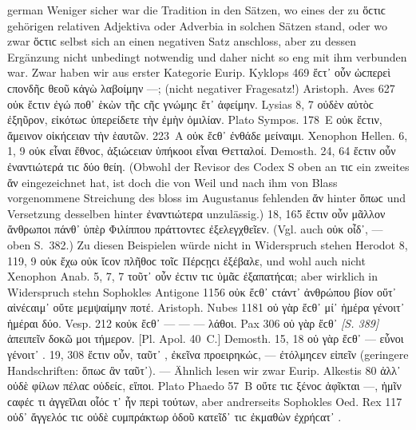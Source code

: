 \begin{otherlanguage*}{german}
Weniger sicher war die Tradition in den Sätzen, wo eines der zu ὅϲτιϲ gehörigen relativen Adjektiva oder Adverbia in solchen Sätzen stand, oder wo zwar ὅϲτιϲ selbst sich an einen negativen Satz anschloss, aber zu dessen Ergänzung nicht unbedingt notwendig und daher nicht so eng mit ihm verbunden war. Zwar haben wir aus erster Kategorie Eurip. Kyklops 469 ἔϲτ᾽ οὖν  ὡϲπερεὶ ϲπονδῆϲ θεοῦ κἀγὼ λαβοίμην —; (nicht negativer Fragesatz!) Aristoph. Aves 627 οὐκ ἔϲτιν  ἐγώ ποθ᾽ ἑκὼν τῆϲ ϲῆϲ γνώμηϲ ἔτ᾽ ἀφείμην. Lysias 8, 7 οὐδὲν αὐτὸϲ ἐξηῦρον,  εἰκότωϲ ὑπερείδετε τὴν ἐμὴν ὁμιλίαν. Plato Sympos. 178~Ε οὐκ ἔϲτιν,  ἄμεινον οἰκήϲειαν τὴν ἑαυτῶν. 223~Α οὐκ ἔϲθ᾽  ἐνθάδε μείναιμι. Xenophon Hellen. 6, 1, 9 οὐκ εἶναι ἔθνοϲ,  ἀξιώϲειαν ὑπήκοοι εἶναι Θετταλοί. Demosth. 24, 64 ἔϲτιν οὖν  ἐναντιώτερά τιϲ δύο θείη. (Obwohl der Revisor des Codex S oben an τιϲ ein zweites ἄν eingezeichnet hat, ist doch die von Weil und nach ihm von Blass vorgenommene Streichung des bloss im Augustanus fehlenden ἄν hinter ὅπωϲ und Versetzung desselben hinter ἐναντιώτερα unzulässig.) 18, 165 ἔϲτιν οὖν  μᾶλλον ἄνθρωποι πάνθ᾽ ὑπὲρ Φιλίππου πράττοντεϲ ἐξελεγχθεῖεν. (Vgl. auch οὐκ οἶδ᾽,  — oben S.~382.) Zu diesen Beispielen würde nicht in Widerspruch stehen Herodot 8, 119, 9 οὐκ ἔχω  οὐκ  ἴϲον πλῆθοϲ τοῖϲ Πέρϲῃϲι ἐξέβαλε, und wohl auch nicht Xenophon Anab. 5, 7, 7 τοῦτ᾽ οὖν ἐϲτιν  τιϲ  ὑμᾶϲ ἐξαπατήϲαι; aber wirklich in Widerspruch stehn Sophokles Antigone 1156 οὐκ ἔϲθ᾽  ϲτάντ᾽  ἀνθρώπου βίον οὔτ᾽ αἰνέϲαιμ᾽  οὔτε μεμψαίμην ποτέ. Aristoph. Nubes 1181 οὐ γὰρ ἔϲθ᾽  μί᾽ ἡμέρα γένοιτ᾽  ἡμέραι δύο. Vesp. 212 κοὐκ ἔϲθ᾽  —  — — λάθοι. Pax 306 οὐ γὰρ ἔϲθ᾽  \hypertarget{p389}{\emph{[S. 389]}}\label{p389} ἀπειπεῖν  δοκῶ μοι τήμερον. [Pl. Apol. 40~C.] Demosth. 15, 18 οὐ γὰρ ἔϲθ᾽  — εὖνοι γένοιτ᾽ . 19, 308 ἔϲτιν οὖν,  ταῦτ᾽ , ἐκεῖνα προειρηκώϲ, — ἐτόλμηϲεν εἰπεῖν (geringere Handschriften: ὅπωϲ ἂν ταῦτ᾽). — Ähnlich lesen wir zwar Eurip. Alkestis 80 ἀλλ᾽ οὐδὲ φίλων πέλαϲ οὐδείϲ,  εἴποι. Plato Phaedo 57~Β οὔτε τιϲ ξένοϲ ἀφῖκται —,  ἡμῖν ϲαφέϲ τι ἀγγεῖλαι οἷόϲ τ᾽ ἦν περὶ τούτων, aber andrerseits Sophokles Oed. Rex 117 οὐδ᾽ ἄγγελόϲ τιϲ οὐδὲ ϲυμπράκτωρ ὁδοῦ κατεῖδ᾽  τιϲ ἐκμαθὼν ἐχρήϲατ᾽ .


\end{otherlanguage*}
